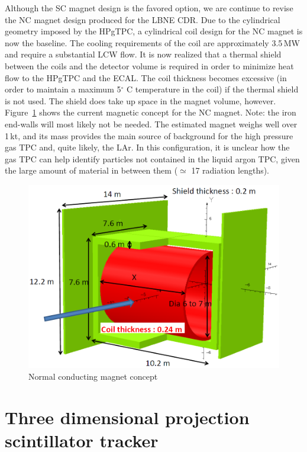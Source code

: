 Although the SC magnet design is the favored option, we are continue to revise the NC magnet design produced for the LBNE CDR.  Due to the cylindrical geometry imposed by the HPgTPC, a cylindrical coil design for the NC magnet is now the baseline. The cooling requirements of the coil are approximately 3.5\,MW and require a substantial LCW flow. It is now realized that a thermal shield between the coils and the detector volume is required in order to minimize heat flow to the HPgTPC and the ECAL. The coil thickness becomes excessive (in order to maintain a maximum 5$^\circ$ C temperature in the coil) if the thermal shield is not used.  The shield does take up space in the magnet volume, however.  Figure~\ref{fig:dune_nd_magnet_nc_layout} shows the current magnetic concept for the NC magnet.  Note: the iron end-walls will most likely not be needed. The estimated magnet weighs well over 1\,kt, and its mass provides the main source of background for the high pressure gas TPC and, quite likely, the LAr. In this configuration, it is unclear how the gas TPC can help identify particles not contained in the liquid argon TPC, given the large amount of material in between them ($\simeq$ 17 radiation lengths).
%
\begin{figure}[h]
\centering 
\includegraphics[width=0.95\columnwidth]{graphics/dune_nd_magnet_nc_layout.png} 
\caption{Normal conducting magnet concept} 
\label{fig:dune_nd_magnet_nc_layout} 
\end{figure}
%




\section{Three dimensional projection scintillator tracker}
\label{sec:exsum-nd-mpt-3DST}

